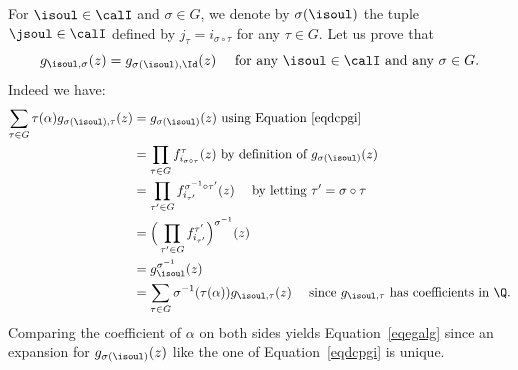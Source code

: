 For $ \isoul\in\calI$ and $\sigma\in G$, we denote by $\sigma(\isoul)$ the tuple $\jsoul\in\calI$ defined by $j_\tau = i_{\sigma\circ\tau}$ for any $\tau\in G$. Let us prove that
\begin{equation} \label{eqegalg}
g_{\isoul,\sigma}(z) = g_{\sigma(\isoul),\Id}(z) \quad \mbox{ for any } \isoul\in\calI
\mbox{ and any } \sigma\in G.
\end{equation}
Indeed we have:
\begin{align*}
\sum_{\tau\in G} \tau(\alpha) g_{\sigma(\isoul),\tau}(z)
&=
g_{\sigma(\isoul)}(z) \mbox{ using Equation~\eqref{eqdcpgi}}
\\
&=
\prod_{\tau\in G} f_{i_{\sigma\circ\tau}}^\tau(z)
\mbox{ by definition of $g_{\sigma(\isoul)}(z)$}
\\
&=
\prod_{\tau'\in G} f_{i_{ \tau'}}^{\sigma^{-1}\circ \tau'}(z) \quad \mbox{ by letting }
\tau' = \sigma\circ\tau\\
&=
\Big( \prod_{\tau'\in G} f_{i_{ \tau'}}^{ \tau'}\Big)^{\sigma^{-1}}(z)\\
&= g_\isoul^{\sigma^{-1}}(z) \\
&=
\sum_{\tau\in G} \sigma^{-1}(\tau(\alpha)) g_{ \isoul ,\tau}(z)
\quad \mbox{ since $g_{ \isoul ,\tau} $ has coefficients in $\Q$.}
\end{align*}
Comparing the coefficient of $\alpha$ on both sides yields Equation~\eqref{eqegalg} since an expansion for $g_{\sigma(\isoul)}(z)$ like the one of Equation~\eqref{eqdcpgi} is unique.

